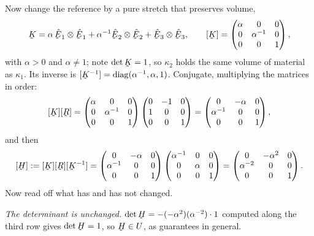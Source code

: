 Now change the reference by a pure stretch that preserves volume,
\[
   \bK=\alpha\,\hbE_{1}\otimes\hbE_{1}
      +\alpha^{-1}\hbE_{2}\otimes\hbE_{2}
      +\hbE_{3}\otimes\hbE_{3},
   \qquad
   [\bK]=\begin{pmatrix}\alpha&0&0\\ 0&\alpha^{-1}&0\\
                        0&0&1\end{pmatrix},
\]
with $\alpha>0$ and $\alpha\neq1$; note $\det\bK=1$, so $\kappa_{2}$
holds the same volume of material as $\kappa_{1}$. Its inverse is
$[\bK^{-1}]=\operatorname{diag}(\alpha^{-1},\alpha,1)$. Conjugate,
multiplying the matrices in order:
\[
   [\bK][\bR]
   =\begin{pmatrix}\alpha&0&0\\ 0&\alpha^{-1}&0\\ 0&0&1\end{pmatrix}
    \begin{pmatrix}0&-1&0\\ 1&0&0\\ 0&0&1\end{pmatrix}
   =\begin{pmatrix}0&-\alpha&0\\ \alpha^{-1}&0&0\\
                   0&0&1\end{pmatrix},
\]
and then
\[
   [\bH]:=[\bK][\bR][\bK^{-1}]
   =\begin{pmatrix}0&-\alpha&0\\ \alpha^{-1}&0&0\\
                   0&0&1\end{pmatrix}
    \begin{pmatrix}\alpha^{-1}&0&0\\ 0&\alpha&0\\
                   0&0&1\end{pmatrix}
   =\begin{pmatrix}0&-\alpha^{2}&0\\ \alpha^{-2}&0&0\\
                   0&0&1\end{pmatrix}.
\]
Now read off what has and has not changed.

\emph{The determinant is unchanged.} $\det\bH=
-(-\alpha^{2})(\alpha^{-2})\cdot 1$ computed along the third row gives
$\det\bH=1$, so $\bH\in U$, as  guarantees in general.

